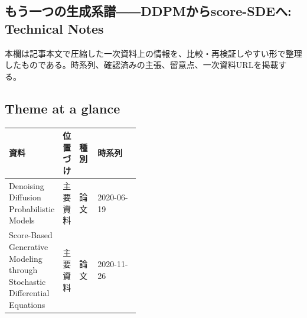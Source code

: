 \subsection*{もう一つの生成系譜――DDPMからscore-SDEへ: Technical Notes}
本欄は記事本文で圧縮した一次資料上の情報を、比較・再検証しやすい形で整理したものである。時系列、確認済みの主張、留意点、一次資料URLを掲載する。
\smallskip
{}\par
\medskip
\subsection*{Theme at a glance}
\begin{center}
\footnotesize
\begin{tabularx}{\linewidth}{@{}p{0.20\linewidth}p{0.10\linewidth}p{0.14\linewidth}X@{}}
\toprule
資料 & 位置づけ & 種別 & 時系列 \\
\midrule
Denoising Diffusion Probabilistic Models & 主要資料 & 論文 & 2020-06-19 \\
Score-Based Generative Modeling through Stochastic Differential Equations & 主要資料 & 論文 & 2020-11-26 \\
\bottomrule
\end{tabularx}
\end{center}
\normalsize

